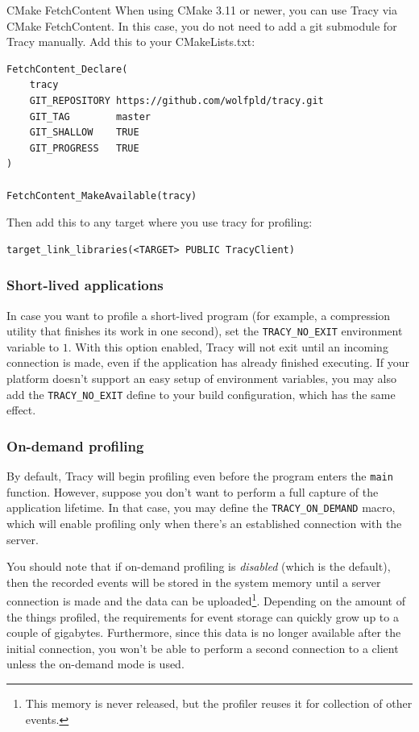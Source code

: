 \documentclass[hidelinks,titlepage,a4paper]{article}
\begin{document}
\begin{bclogo}[
noborder=true,
couleur=black!5,
logo=\bclampe
]{CMake FetchContent}
When using CMake 3.11 or newer, you can use Tracy via CMake FetchContent. In this case, you do not need to add a git submodule for Tracy manually. Add this to your CMakeLists.txt:

\begin{lstlisting}
FetchContent_Declare(
    tracy
    GIT_REPOSITORY https://github.com/wolfpld/tracy.git
    GIT_TAG        master
    GIT_SHALLOW    TRUE
    GIT_PROGRESS   TRUE
)

FetchContent_MakeAvailable(tracy)
\end{lstlisting}

Then add this to any target where you use tracy for profiling:

\begin{lstlisting}
target_link_libraries(<TARGET> PUBLIC TracyClient)
\end{lstlisting}
\end{bclogo}

\subsubsection{Short-lived applications}

In case you want to profile a short-lived program (for example, a compression utility that finishes its work in one second), set the \texttt{TRACY\_NO\_EXIT} environment variable to $1$. With this option enabled, Tracy will not exit until an incoming connection is made, even if the application has already finished executing. If your platform doesn't support an easy setup of environment variables, you may also add the \texttt{TRACY\_NO\_EXIT} define to your build configuration, which has the same effect.

\subsubsection{On-demand profiling}
\label{ondemand}

By default, Tracy will begin profiling even before the program enters the \texttt{main} function. However, suppose you don't want to perform a full capture of the application lifetime. In that case, you may define the \texttt{TRACY\_ON\_DEMAND} macro, which will enable profiling only when there's an established connection with the server.

You should note that if on-demand profiling is \emph{disabled} (which is the default), then the recorded events will be stored in the system memory until a server connection is made and the data can be uploaded\footnote{This memory is never released, but the profiler reuses it for collection of other events.}. Depending on the amount of the things profiled, the requirements for event storage can quickly grow up to a couple of gigabytes. Furthermore, since this data is no longer available after the initial connection, you won't be able to perform a second connection to a client unless the on-demand mode is used.
\end{document}
